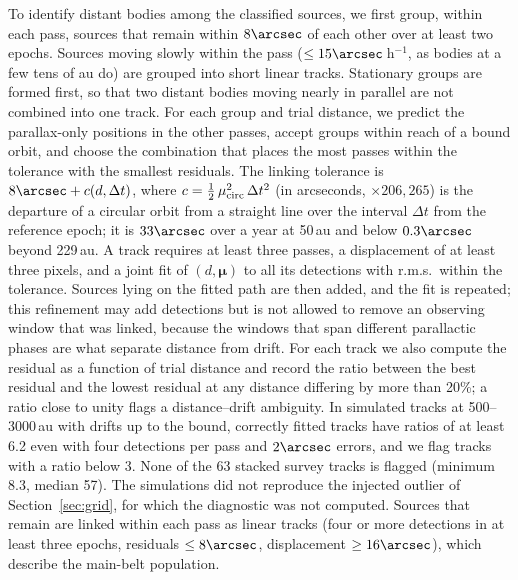 \documentclass[twocolumn,linenumbers]{aastex702}
\begin{document}
To identify distant bodies among the classified sources, we first group, within each pass, sources that remain within $8\arcsec$ of each other over at least two epochs. Sources moving slowly within the pass ($\le 15\arcsec$\,h$^{-1}$, as bodies at a few tens of au do) are grouped into short linear tracks. Stationary groups are formed first, so that two distant bodies moving nearly in parallel are not combined into one track. For each group and trial distance, we predict the parallax-only positions in the other passes, accept groups within reach of a bound orbit, and choose the combination that places the most passes within the tolerance with the smallest residuals. The linking tolerance is $8\arcsec + c(d, \Delta t)$, where $c = \frac{1}{2}\,\mu_{\rm circ}^2\,\Delta t^2$ (in arcseconds, $\times 206{,}265$) is the departure of a circular orbit from a straight line over the interval $\Delta t$ from the reference epoch; it is $33\arcsec$ over a year at 50\,au and below $0.3\arcsec$ beyond 229\,au. A track requires at least three passes, a displacement of at least three pixels, and a joint fit of $(d, \boldsymbol{\mu})$ to all its detections with r.m.s.\ within the tolerance. Sources lying on the fitted path are then added, and the fit is repeated; this refinement may add detections but is not allowed to remove an observing window that was linked, because the windows that span different parallactic phases are what separate distance from drift. For each track we also compute the residual as a function of trial distance and record the ratio between the best residual and the lowest residual at any distance differing by more than 20\%; a ratio close to unity flags a distance--drift ambiguity. In simulated tracks at 500--3000\,au with drifts up to the bound, correctly fitted tracks have ratios of at least 6.2 even with four detections per pass and $2\arcsec$ errors, and we flag tracks with a ratio below 3. None of the 63 stacked survey tracks is flagged (minimum 8.3, median 57). The simulations did not reproduce the injected outlier of Section~\ref{sec:grid}, for which the diagnostic was not computed. Sources that remain are linked within each pass as linear tracks (four or more detections in at least three epochs, residuals $\le 8\arcsec$, displacement $\ge 16\arcsec$), which describe the main-belt population.
\end{document}
